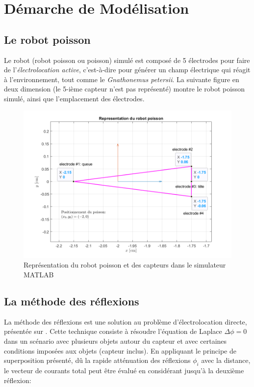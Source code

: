 \section{Démarche de Modélisation}
\subsection{Le robot poisson}

Le robot (robot poisson ou poisson) simulé est composé de 5 électrodes pour faire de l'\textit{électrolocation active}, c'est-à-dire pour générer un champ électrique qui réagit à l'environnement, tout comme le \textit{Gnathonemus petersii}. La suivante figure en deux dimension (le 5-ième capteur n'est pas représenté) montre le robot poisson simulé, ainsi que l'emplacement des électrodes. 

\begin{figure}[h!]
    \centering
    \includegraphics[width=\textwidth]{assets/poisson/poisson.png}
    \caption{Représentation du robot poisson et des capteurs dans le simulateur MATLAB}
    \label{fig:poisson}
\end{figure}

\subsection{La méthode des réflexions}
La méthode des réflexions est une solution au problème d'électrolocation directe, présentée sur \cite{Boyer2012}. Cette technique consiste à résoudre l'équation de Laplace $\Delta\phi = 0$ dans un scénario avec plusieurs objets autour du capteur et avec certaines conditions imposées aux objets (capteur inclus). En appliquant le principe de superposition présenté, dû la rapide atténuation des réflexions $\phi_i$ avec la distance, le vecteur de courants total peut être évalué en considérant jusqu'à la deuxième réflexion: 


